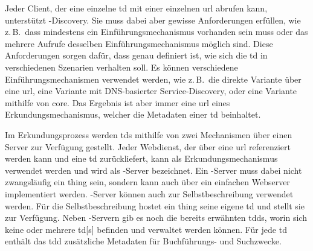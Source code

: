 Jeder Client, der eine einzelne \gls{td} mit einer einzelnen \gls{url} abrufen kann, unterstützt -Discovery.
Sie muss dabei aber gewisse Anforderungen erfüllen, wie z.\,B.\ dass mindestens ein Einführungsmechanismus vorhanden sein muss
oder das mehrere Aufrufe desselben Einführungsmechanismus möglich sind.
Diese Anforderungen sorgen dafür, dass genau definiert ist, wie sich die \gls{td} in verschiedenen Szenarien verhalten soll.
Es können verschiedene Einführungsmechanismen verwendet werden, wie z.\,B.\ die direkte Variante über eine \gls{url}, eine Variante mit DNS-basierter Service-Discovery, oder eine Variante mithilfe von \gls{core}.
Das Ergebnis ist aber immer eine \gls{url} eines Erkundungsmechanismus, welcher die Metadaten einer \gls{td} beinhaltet.

Im Erkundungsprozess werden \glspl{td} mithilfe von zwei Mechanismen über einen Server zur Verfügung gestellt.
Jeder Webdienst, der über eine \gls{url} referenziert werden kann und eine \gls{td} zurückliefert, kann als Erkundungsmechanismus verwendet werden und wird als -Server bezeichnet.
Ein -Server muss dabei nicht zwangsläufig ein \gls{thing} sein, sondern kann auch über ein einfachen Webserver implementiert werden.
-Server können auch zur Selbstbeschreibung verwendet werden. Für die Selbstbeschreibung hostet ein \gls{thing} seine eigene \gls{td} und stellt sie zur Verfügung.
Neben -Servern gib es noch die bereits erwähnten \glspl{tdd}, worin sich keine oder mehrere \gls{td}[s] befinden und verwaltet werden können.
Für jede \gls{td} enthält das \gls{tdd} zusätzliche Metadaten für Buchführungs- und Suchzwecke.
